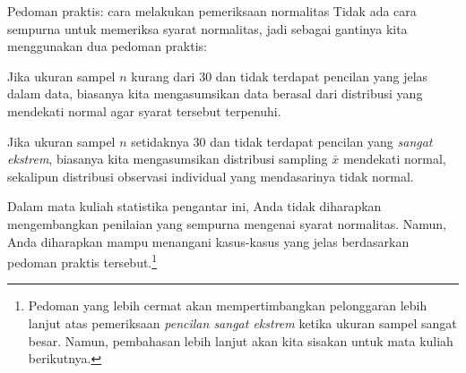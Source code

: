 \begin{onebox}{Pedoman praktis:
    cara melakukan pemeriksaan normalitas}
  Tidak ada cara sempurna untuk memeriksa syarat normalitas,
  jadi sebagai gantinya kita menggunakan dua pedoman praktis: %
  \begin{description}
  \setlength{\itemsep}{0mm}
  \item[$\mathbf{n < 30}$:]
      Jika ukuran sampel $n$ kurang dari 30
      dan tidak terdapat pencilan yang jelas dalam data,
      biasanya kita mengasumsikan data berasal dari
      distribusi yang mendekati normal agar
      syarat tersebut terpenuhi.
  \item[$\mathbf{n \geq 30}$:]
      Jika ukuran sampel $n$ setidaknya 30
      dan tidak terdapat pencilan yang \emph{sangat ekstrem},
      biasanya kita mengasumsikan distribusi sampling
      $\bar{x}$ mendekati normal, sekalipun distribusi
      observasi individual yang mendasarinya tidak normal.
  \end{description}
\end{onebox}

Dalam mata kuliah statistika pengantar ini, Anda tidak diharapkan
mengembangkan penilaian yang sempurna mengenai syarat normalitas.
Namun, Anda diharapkan mampu menangani
kasus-kasus yang jelas berdasarkan pedoman praktis tersebut.\footnote{Pedoman
  yang lebih cermat akan mempertimbangkan pelonggaran lebih lanjut
  atas pemeriksaan \emph{pencilan sangat ekstrem} ketika
  ukuran sampel sangat besar.
  Namun, pembahasan lebih lanjut akan kita sisakan untuk mata kuliah berikutnya.}

